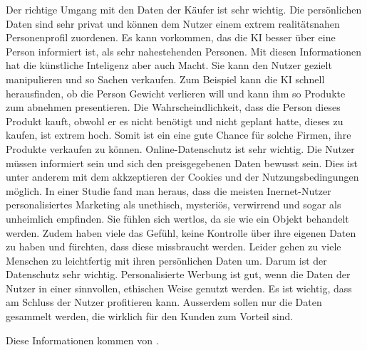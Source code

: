 \documentclass{article}
\begin{document}
Der richtige Umgang mit den Daten der Käufer ist sehr wichtig. Die persönlichen Daten sind sehr privat und können dem Nutzer einem extrem realitätsnahen Personenprofil zuordenen. Es kann vorkommen, das die KI besser über eine Person informiert ist, als sehr nahestehenden Personen. Mit diesen Informationen hat die künstliche Inteligenz aber auch Macht. Sie kann den Nutzer gezielt manipulieren und so Sachen verkaufen. Zum Beispiel kann die KI schnell herausfinden, ob die Person Gewicht verlieren will und kann ihm so Produkte zum abnehmen presentieren. Die Wahrscheindlichkeit, dass die Person dieses Produkt kauft, obwohl er es nicht benötigt und nicht geplant hatte, dieses zu kaufen, ist extrem hoch. Somit ist ein eine gute Chance für solche Firmen, ihre Produkte verkaufen zu können. Online-Datenschutz ist sehr wichtig. Die Nutzer müssen informiert sein und sich den preisgegebenen Daten bewusst sein. Dies ist unter anderem mit dem akkzeptieren der Cookies und der Nutzungsbedingungen möglich. In einer Studie fand man heraus, dass die meisten Inernet-Nutzer personalisiertes Marketing als unethisch, mysteriös, verwirrend und sogar als unheimlich empfinden. Sie fühlen sich wertlos, da sie wie ein Objekt behandelt werden. Zudem haben viele das Gefühl, keine Kontrolle über ihre eigenen Daten zu haben und fürchten, dass diese missbraucht werden. Leider gehen zu viele Menschen zu leichtfertig mit ihren persönlichen Daten um. Darum ist der Datenschutz sehr wichtig. 
Personalisierte Werbung ist gut, wenn die Daten der Nutzer in einer sinnvollen, ethischen Weise genutzt werden. Es ist wichtig, dass am Schluss der Nutzer profitieren kann. Ausserdem sollen nur die Daten gesammelt werden, die wirklich für den Kunden zum Vorteil sind. 

Diese Informationen kommen von \citep{Basicthinking}. 

\printbibliography

\nocite{*}
\end{document}
